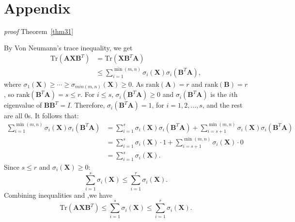 \documentclass{article}
\begin{document}
{%

\medskip
{\small{}

}{\small\par}




\appendix


\section{Appendix}
\textit{proof} Theorem~\ref{thm31}

By Von Neumann's trace inequality, we get
\begin{equation}
    \begin{aligned}
        \text{Tr}(\mathbf A\mathbf X\mathbf B^T) & = \text{Tr}(\mathbf X\mathbf B^T\mathbf A) \\
        & \leq  \sum_{i=1}^{\min(m,n)} \sigma_i(\mathbf X) \sigma_i(\mathbf B^T\mathbf A),
    \end{aligned}
\end{equation}
where $\sigma_1(\mathbf X) \geq \cdots \geq \sigma_{min(m,n)}(\mathbf X) \geq 0 $. As $\text{rank}(\mathbf A) = r$ and $\text{rank}(\mathbf B) =r$, so $\text{rank}(\mathbf B^T\mathbf A) =s \leq r$. For $i \leq s$, $\sigma_i(\mathbf B^T\mathbf A) \geq 0$ and $\sigma_i(\mathbf B^T\mathbf A)$ is the $i$th eigenvalue of $\mathbf B\mathbf B^T=I$. Therefore, $\sigma_i(\mathbf B^T\mathbf A) = 1$, for $i=1,2,\dots,s$, and the rest are all 0s. It follows that:
\begin{equation}
    \begin{aligned}
        \sum_{i=1}^{\min(m,n)} \sigma_i(\mathbf X) \sigma_i(\mathbf B^T\mathbf A) & = \sum_{i=1}^{s} \sigma_i(\mathbf X) \sigma_i(\mathbf B^T\mathbf A) + \sum_{i=s+1}^{\min(m,n)} \sigma_i(\mathbf X) \sigma_i(\mathbf B^T\mathbf A) \\
        & = \sum_{i=1}^{s} \sigma_i(\mathbf X) \cdot 1 + \sum_{i=s+1}^{\min(m,n)} \sigma_i(\mathbf X) \cdot 0 \\
        & = \sum_{i=1}^{s} \sigma_i(\mathbf X).
    \end{aligned}
\end{equation}
Since $s \leq r$ and $\sigma_i(\mathbf X) \geq 0$:
\begin{equation*}
    \sum_{i=1}^s \sigma_i(\mathbf X)\leq \sum_{i=1}^r \sigma_i(\mathbf X).
\end{equation*}
Combining inequalities and ,we have 
\begin{equation}
    \text{Tr}(\mathbf A\mathbf X\mathbf B^T) \leq \sum_{i=1}^s \sigma_i(\mathbf X)\leq \sum_{i=1}^r \sigma_i(\mathbf X).
\end{equation}


}
\end{document}
